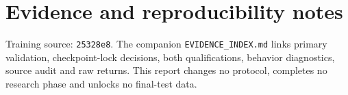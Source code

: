 \section*{Evidence and reproducibility notes}
Training source: \texttt{25328e8}. The companion \texttt{EVIDENCE\_INDEX.md}
links primary validation, checkpoint-lock decisions, both qualifications,
behavior diagnostics, source audit and raw returns. This report changes no
protocol, completes no research phase and unlocks no final-test data.

\clearpage
